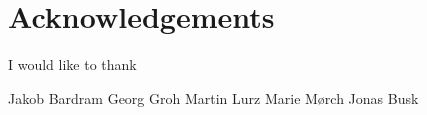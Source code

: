 \chapter{Acknowledgements}
I would like to thank

Jakob Bardram
Georg Groh
Martin Lurz
Marie Mørch
Jonas Busk
